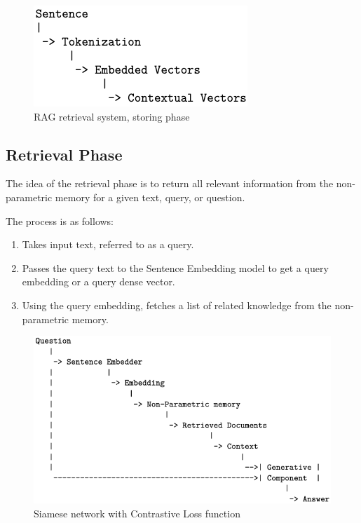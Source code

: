 \documentclass{wseas}
\begin{document}
\begin{figure}[htbp]
  \centering
  \includegraphics[width=\linewidth]{resources/v1/retrievalSystemStoringPhase.png}
  \caption{RAG retrieval system, storing phase}
  \label{fig:retrieval_system_storing_phase_figure}
\end{figure}

\subsection{Retrieval Phase}

The idea of the retrieval phase is to return all relevant information
from the non-parametric memory for a given text, query, or question.

The process is as follows:
\begin{enumerate}
\item
  Takes input text, referred to as a query.
\item
  Passes the query text to the Sentence Embedding model to get a query
  embedding or a query dense vector.
\item
  Using the query embedding, fetches a list of related knowledge from
  the non-parametric memory.
\end{enumerate}


\begin{figure}[htbp]
  \centering
  \includegraphics[width=\linewidth]{resources/v1/retrievalSystemRetreavalPhase.png} %
  \caption{Siamese network with Contrastive Loss function}
  \label{fig:retrieval_system_retreaval_phase_figure}
\end{figure}
\end{document}
